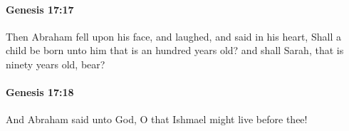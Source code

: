 		\paragraph{Genesis 17:17} %
			\label{GENESIS-17-17}

			Then Abraham fell upon his face, and laughed, and said in his heart, Shall a child be born unto him that is an hundred years old? and shall Sarah, that is ninety years old, bear?


		\paragraph{Genesis 17:18} %
			\label{GENESIS-17-18}

			And Abraham said unto God, O that Ishmael might live before thee!


